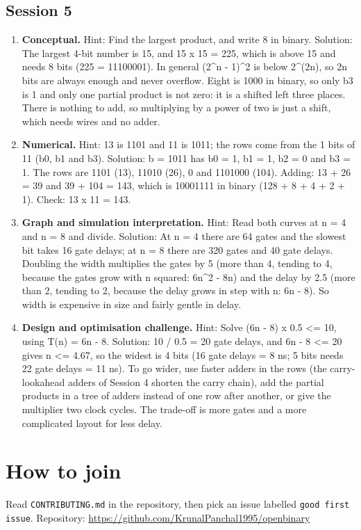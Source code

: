 \documentclass[11pt,a4paper]{article}
\begin{document}
\subsection*{Session 5}
\begin{enumerate}[nosep]
\item \textbf{Conceptual.} Hint: Find the largest product, and write 8 in binary. Solution: The largest 4-bit number is 15, and 15 x 15 = 225, which is above 15 and needs 8 bits (225 = 11100001). In general (2\textasciicircum{}n - 1)\textasciicircum{}2 is below 2\textasciicircum{}(2n), so 2n bits are always enough and never overflow. Eight is 1000 in binary, so only b3 is 1 and only one partial product is not zero: it is a shifted left three places. There is nothing to add, so multiplying by a power of two is just a shift, which needs wires and no adder.
\item \textbf{Numerical.} Hint: 13 is 1101 and 11 is 1011; the rows come from the 1 bits of 11 (b0, b1 and b3). Solution: b = 1011 has b0 = 1, b1 = 1, b2 = 0 and b3 = 1. The rows are 1101 (13), 11010 (26), 0 and 1101000 (104). Adding: 13 + 26 = 39 and 39 + 104 = 143, which is 10001111 in binary (128 + 8 + 4 + 2 + 1). Check: 13 x 11 = 143.
\item \textbf{Graph and simulation interpretation.} Hint: Read both curves at n = 4 and n = 8 and divide. Solution: At n = 4 there are 64 gates and the slowest bit takes 16 gate delays; at n = 8 there are 320 gates and 40 gate delays. Doubling the width multiplies the gates by 5 (more than 4, tending to 4, because the gates grow with n squared: 6n\textasciicircum{}2 - 8n) and the delay by 2.5 (more than 2, tending to 2, because the delay grows in step with n: 6n - 8). So width is expensive in size and fairly gentle in delay.
\item \textbf{Design and optimisation challenge.} Hint: Solve (6n - 8) x 0.5 \textless{}= 10, using T(n) = 6n - 8. Solution: 10 / 0.5 = 20 gate delays, and 6n - 8 \textless{}= 20 gives n \textless{}= 4.67, so the widest is 4 bits (16 gate delays = 8 ns; 5 bits needs 22 gate delays = 11 ns). To go wider, use faster adders in the rows (the carry-lookahead adders of Session 4 shorten the carry chain), add the partial products in a tree of adders instead of one row after another, or give the multiplier two clock cycles. The trade-off is more gates and a more complicated layout for less delay.
\end{enumerate}

\section{How to join}
Read \texttt{CONTRIBUTING.md} in the repository, then pick an issue labelled \texttt{good first issue}. Repository: \url{https://github.com/KrunalPanchal1995/openbinary}
\end{document}
